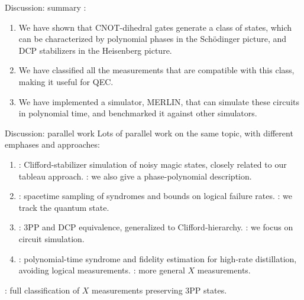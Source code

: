 \documentclass[aspectratio=169,11pt,t]{beamer}
\begin{document}
\begin{frame}{Discussion: summary}
  :
  \begin{enumerate}
    \item We have shown that CNOT-dihedral gates generate a class of states, which can be characterized by polynomial phases in the Schödinger picture, and DCP stabilizers in the Heisenberg picture.
    \pause
    \item We have classified all the measurements that are compatible with this class, making it useful for QEC.
    \pause
    \item We have implemented a simulator, MERLIN, that can simulate these circuits in polynomial time, and benchmarked it against other simulators.
  \end{enumerate}
\end{frame}

\begin{frame}{Discussion: parallel work}
  Lots of parallel work on the same topic, with different emphases and approaches:
  \begin{enumerate}
    \item {}:
      Clifford-stabilizer simulation of noisy magic states, closely related to our tableau approach.
      : we also give a phase-polynomial description.
    \pause
    \item {}:
      spacetime sampling of syndromes and bounds on logical failure rates. :
      we track the quantum state.
    \pause
    \item {}:
      3PP and DCP equivalence, generalized to Clifford-hierarchy.
      : we focus on circuit simulation.
    \pause
    \item {}:
      polynomial-time syndrome and fidelity estimation for high-rate distillation, avoiding logical measurements.
      : more general $X$ measurements.
  \end{enumerate}

  : full classification of $X$ measurements
  preserving 3PP states.
  \newline
\end{frame}
\end{document}
